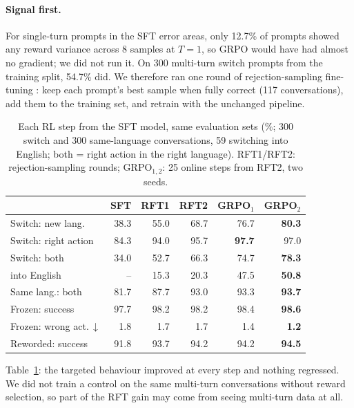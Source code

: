 \documentclass[11pt]{article}
\begin{document}
\paragraph{Signal first.} For single-turn prompts in the SFT error areas, only 12.7\% of prompts showed any reward
variance across 8 samples at $T{=}1$, so GRPO \citep{shao2024deepseekmath} would have had almost no gradient; we did
not run it. On 300 multi-turn switch prompts from the training split, 54.7\% did. We therefore ran one round of
rejection-sampling fine-tuning \citep{yuan2023rft}: keep each prompt's best sample when fully correct (117
conversations), add them to the training set, and retrain with the unchanged pipeline.

\begin{table}[t]
\centering
\small
\setlength{\tabcolsep}{2.5pt}
\begin{tabular}{lrrrrr}
\toprule
 & SFT & RFT1 & RFT2 & GRPO$_1$ & GRPO$_2$ \\
\midrule
Switch: new lang. & 38.3 & 55.0 & 68.7 & 76.7 & \textbf{80.3} \\
Switch: right action & 84.3 & 94.0 & 95.7 & \textbf{97.7} & 97.0 \\
Switch: both & 34.0 & 52.7 & 66.3 & 74.7 & \textbf{78.3} \\
\quad into English & -- & 15.3 & 20.3 & 47.5 & \textbf{50.8} \\
Same lang.: both & 81.7 & 87.7 & 93.0 & 93.3 & \textbf{93.7} \\
Frozen: success & 97.7 & 98.2 & 98.2 & 98.4 & \textbf{98.6} \\
Frozen: wrong act.\,$\downarrow$ & 1.8 & 1.7 & 1.7 & 1.4 & \textbf{1.2} \\
Reworded: success & 91.8 & 93.7 & 94.2 & 94.2 & \textbf{94.5} \\
\bottomrule
\end{tabular}
\caption{Each RL step from the SFT model, same evaluation sets (\%; 300 switch and 300 same-language conversations,
59 switching into English; both = right action in the right language). RFT1/RFT2: rejection-sampling rounds; GRPO$_{1,2}$: 25 online steps from RFT2, two seeds.}
\label{tab:rl}
\end{table}

Table~\ref{tab:rl}: the targeted behaviour improved at every step and nothing regressed. We did not train a control
on the same multi-turn conversations without reward selection, so part of the RFT gain may come from seeing
multi-turn data at all.
\end{document}
